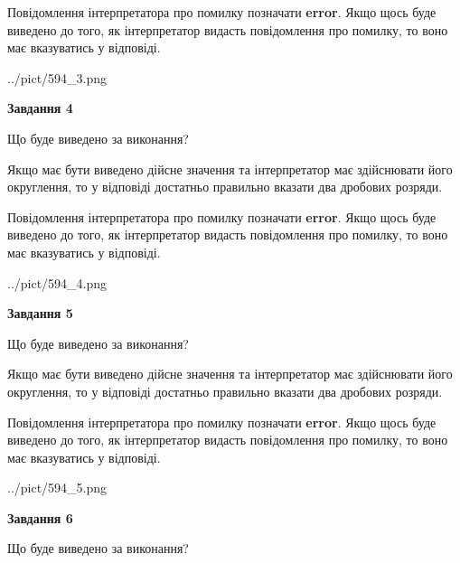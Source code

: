 \documentclass[12pt, ukrainian]{article}
\begin{document}
{\begin {Large}
Повідомлення інтерпретатора про помилку позначати \textbf{error}.
Якщо щось буде виведено до того, як інтерпретатор видасть повідомлення про помилку, 
то воно має вказуватись у відповіді. \par

\begin{center}
	{../pict/594_3.png}
\end{center}
\newpage

{\begin {center}\textbf{Завдання 4}\end {center}}\par
Що буде виведено за виконання? \par

Якщо має бути виведено дійсне значення та інтерпретатор має здійснювати його округлення, 
то у відповіді достатньо правильно вказати два дробових розряди.

Повідомлення інтерпретатора про помилку позначати \textbf{error}.
Якщо щось буде виведено до того, як інтерпретатор видасть повідомлення про помилку, 
то воно має вказуватись у відповіді. \par

\begin{center}
	{../pict/594_4.png}
\end{center}
\newpage

{\begin {center}\textbf{Завдання 5}\end {center}}\par
Що буде виведено за виконання? \par

Якщо має бути виведено дійсне значення та інтерпретатор має здійснювати його округлення, 
то у відповіді достатньо правильно вказати два дробових розряди.

Повідомлення інтерпретатора про помилку позначати \textbf{error}.
Якщо щось буде виведено до того, як інтерпретатор видасть повідомлення про помилку, 
то воно має вказуватись у відповіді. \par

\begin{center}
	{../pict/594_5.png}
\end{center}
\newpage

{\begin {center}\textbf{Завдання 6}\end {center}}\par
Що буде виведено за виконання? \par


\end{Large}}
\end{document}
